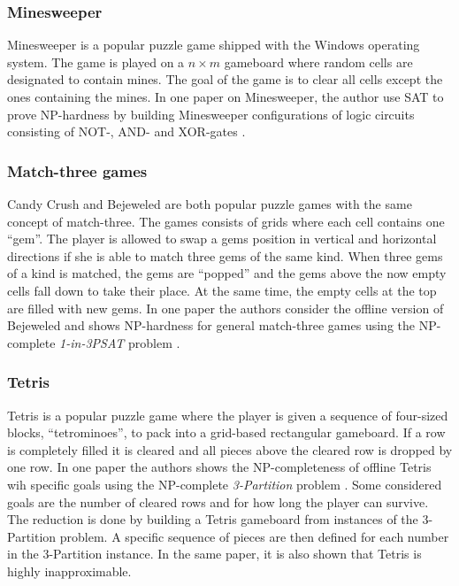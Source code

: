 \subsubsection{Minesweeper}
Minesweeper is a popular puzzle game shipped with the Windows operating system. The game is played on a $n \times m$ gameboard where random cells are designated to contain mines. The goal of the game is to clear all cells except the ones containing the mines. In one paper on Minesweeper, the author use SAT to prove NP-hardness by building Minesweeper configurations of logic circuits consisting of NOT-, AND- and XOR-gates \cite{minesweeper}.

\subsubsection{Match-three games}

Candy Crush and Bejeweled are both popular puzzle games with the same concept of match-three. The games consists of grids where each cell contains one ``gem''. The player is allowed to swap a gems position in vertical and horizontal directions if she is able to match three gems of the same kind. When three gems of a kind is matched, the gems are ``popped'' and the gems above the now empty cells fall down to take their place. At the same time, the empty cells at the top are filled with new gems. In one paper the authors consider the offline version of Bejeweled and shows NP-hardness for general match-three games using the NP-complete \textit{1-in-3PSAT} problem \cite{candy}.

\subsubsection{Tetris}

Tetris is a popular puzzle game where the player is given a sequence of  four-sized blocks, ``tetrominoes'', to pack into a grid-based rectangular gameboard. If a row is completely filled it is cleared and all pieces above the cleared row is dropped by one row. In one paper the authors
shows the NP-completeness of offline Tetris wih specific goals using the NP-complete \textit{3-Partition} problem \cite{tetris}. Some considered goals are the number of cleared rows and for how long the player can survive. The reduction is done by building a Tetris gameboard from instances of the 3-Partition problem. A specific sequence of pieces are then defined for each number in the 3-Partition instance. In the same paper, it is also shown that Tetris is highly inapproximable. 

